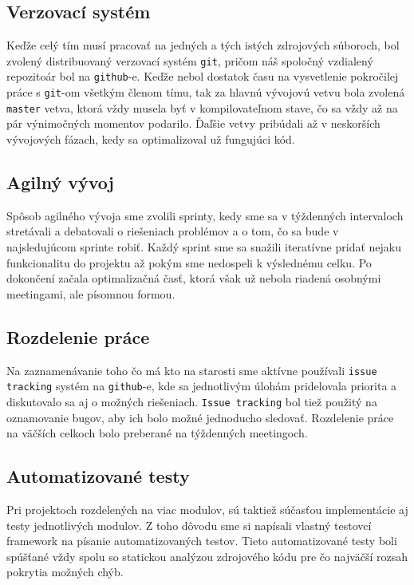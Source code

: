 \documentclass[12pt,a4paper,titlepage,final]{article}
\begin{document}
\subsection{Verzovací systém}
Keďže celý tím musí pracovať na jedných a tých istých zdrojových súboroch,
bol zvolený distribuovaný verzovací systém \texttt{git}, pričom náš spoločný vzdialený
repozitoár bol na \texttt{github}-e. Keďže nebol dostatok času na vysvetlenie
pokročilej práce s \texttt{git}-om všetkým členom tímu, tak za hlavnú vývojovú vetvu
bola zvolená \texttt{master} vetva, ktorá vždy musela byť v kompilovateľnom stave, čo
sa vždy až na pár výnimočných momentov podarilo. Ďaľšie vetvy pribúdali až v neskorších vývojových
fázach, kedy sa optimalizoval už fungujúci kód.

\subsection{Agilný vývoj}
Spôsob agilného vývoja sme zvolili sprinty, kedy sme sa v týždenných intervaloch
stretávali a debatovali o riešeniach problémov a o tom, čo sa bude v najsledujúcom sprinte
robiť. Každý sprint sme sa snažili iteratívne pridať nejaku funkcionalitu do projektu
až pokým sme nedospeli k výslednému celku. Po dokončení začala optimalizačná časť, 
ktorá však už nebola riadená osobnými meetingami, ale písomnou formou.

\subsection{Rozdelenie práce}
Na zaznamenávanie toho čo má kto na starosti sme aktívne používali \texttt{issue tracking}
systém na \texttt{github}-e, kde sa jednotlivým úlohám pridelovala priorita
a diskutovalo sa aj o možných riešeniach. \texttt{Issue tracking} bol tiež použitý
na oznamovanie bugov, aby ich bolo možné jednoducho sledovať. Rozdelenie práce na väčších
celkoch bolo preberané na týždenných meetingoch.

\subsection{Automatizované testy}
Pri projektoch rozdelených na viac modulov, sú taktiež súčasťou implementácie aj
testy jednotlivých modulov. Z toho dôvodu sme si napísali vlastný testovcí framework
na písanie automatizovaných testov. Tieto automatizované testy boli spúšťané vždy spolu
so statickou analýzou zdrojového kódu pre čo najväčší rozsah pokrytia možných chýb.
\end{document}
